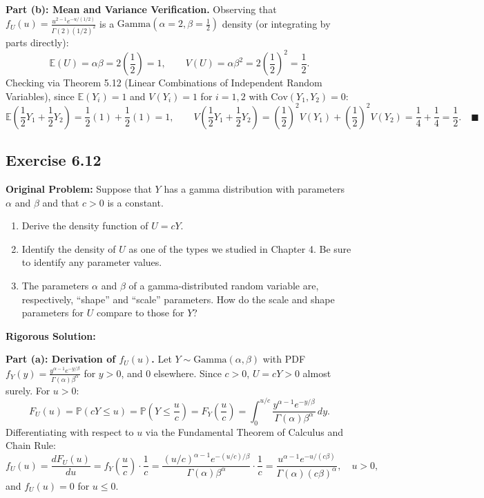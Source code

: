 \documentclass[11pt, letterpaper]{article}
\theoremstyle{definition}
\theoremstyle{remark}
\newcommand{\E}{\mathbb{E}}
\newcommand{\Prob}{\mathbb{P}}
\begin{document}
\textbf{Part (b): Mean and Variance Verification.}
Observing that $f_U(u) = \frac{u^{2 - 1} e^{-u/(1/2)}}{\Gamma(2)(1/2)^2}$ is a $\text{Gamma}\left(\alpha = 2, \beta = \frac{1}{2}\right)$ density (or integrating by parts directly):
\[
    \E(U) = \alpha\beta = 2\left(\frac{1}{2}\right) = 1, \qquad V(U) = \alpha\beta^2 = 2\left(\frac{1}{2}\right)^2 = \frac{1}{2}.
\]
Checking via Theorem 5.12 (Linear Combinations of Independent Random Variables), since $\E(Y_i) = 1$ and $V(Y_i) = 1$ for $i = 1, 2$ with $\text{Cov}(Y_1, Y_2) = 0$:
\[
    \E\left(\frac{1}{2}Y_1 + \frac{1}{2}Y_2\right) = \frac{1}{2}(1) + \frac{1}{2}(1) = 1, \qquad V\left(\frac{1}{2}Y_1 + \frac{1}{2}Y_2\right) = \left(\frac{1}{2}\right)^2 V(Y_1) + \left(\frac{1}{2}\right)^2 V(Y_2) = \frac{1}{4} + \frac{1}{4} = \frac{1}{2}. \quad \blacksquare
\]

\subsection{Exercise 6.12}

\textbf{Original Problem:}
Suppose that $Y$ has a gamma distribution with parameters $\alpha$ and $\beta$ and that $c > 0$ is a constant.
\begin{enumerate}[label=\textbf{\alph*}]
    \item Derive the density function of $U = cY$.
    \item Identify the density of $U$ as one of the types we studied in Chapter 4. Be sure to identify any parameter values.
    \item The parameters $\alpha$ and $\beta$ of a gamma-distributed random variable are, respectively, ``shape'' and ``scale'' parameters. How do the scale and shape parameters for $U$ compare to those for $Y$?
\end{enumerate}

\hrulefill

\textbf{Rigorous Solution:}

\textbf{Part (a): Derivation of $f_U(u)$.}
Let $Y \sim \text{Gamma}(\alpha, \beta)$ with PDF $f_Y(y) = \frac{y^{\alpha - 1} e^{-y/\beta}}{\Gamma(\alpha)\beta^\alpha}$ for $y > 0$, and $0$ elsewhere. Since $c > 0$, $U = cY > 0$ almost surely. For $u > 0$:
\[
    F_U(u) = \Prob(cY \le u) = \Prob\left(Y \le \frac{u}{c}\right) = F_Y\left(\frac{u}{c}\right) = \int_{0}^{u/c} \frac{y^{\alpha - 1} e^{-y/\beta}}{\Gamma(\alpha)\beta^\alpha}\,dy.
\]
Differentiating with respect to $u$ via the Fundamental Theorem of Calculus and Chain Rule:
\[
    f_U(u) = \frac{dF_U(u)}{du} = f_Y\left(\frac{u}{c}\right) \cdot \frac{1}{c} = \frac{(u/c)^{\alpha - 1} e^{-(u/c)/\beta}}{\Gamma(\alpha)\beta^\alpha} \cdot \frac{1}{c} = \frac{u^{\alpha - 1} e^{-u/(c\beta)}}{\Gamma(\alpha)(c\beta)^\alpha}, \quad u > 0,
\]
and $f_U(u) = 0$ for $u \le 0$.
\end{document}
